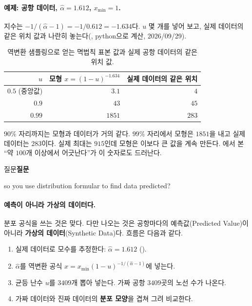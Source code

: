 \documentclass[11pt]{article}
\newenvironment{callout}[1][]
  {\par\medskip\noindent
   \begin{lrbox}{\calloutbox}\begin{minipage}{0.92\linewidth}
   \def\calloutttl{#1}\ifx\calloutttl\empty\else\textbf{#1}\par\smallskip\fi}
  {\end{minipage}\end{lrbox}%
   \fcolorbox{black!30}{black!3}{\usebox{\calloutbox}}\par\medskip}
\newcommand{\term}[1]{\textbf{#1}}
\begin{document}
\paragraph{예제: 공항 데이터, $\hat\alpha = 1.612$, $x_{\min} = 1$.}
지수는 $-1/(\hat\alpha - 1) = -1/0.612 = -1.634$다. $u$ 몇 개를 넣어 보고, 실제 데이터의
같은 위치 값과 나란히 놓는다(, python으로 계산, 2026/09/29).

\begin{table}[H]
  \centering
  \caption{역변환 샘플링으로 얻는 멱법칙 표본 값과 실제 공항 데이터의 같은 위치 값.}
  \label{tab:p1a-inverse}
  \begin{tabular}{rrr}
    \toprule
    $u$ & 모형 $x = (1-u)^{-1.634}$ & 실제 데이터의 같은 위치 \\
    \midrule
    $0.5$ (중앙값) & $3.1$ & $4$ \\
    \midrule
    $0.9$ & $43$ & $45$ \\
    \midrule
    $0.99$ & $1851$ & $283$ \\
    \bottomrule
  \end{tabular}
\end{table}

$90\%$ 자리까지는 모형과 데이터가 거의 같다. $99\%$ 자리에서 모형은 $1851$을 내고
실제 데이터는 $283$이다. 실제 최대는 $915$인데 모형은 이보다 큰 값을 계속 만든다.
에서 본 ``약 $100$개 이상에서 어긋난다''가 이 숫자로도 드러난다.

\begin{callout}[질문]
so you use distribution formular to find data predicted?
\end{callout}

\paragraph{예측이 아니라 가상의 데이터다.}
분포 공식을 쓰는 것은 맞다. 다만 나오는 것은 공항마다의 예측값(Predicted Value)이
아니라 \term{가상의 데이터}(Synthetic Data)다. 흐름은 다음과 같다.
\begin{enumerate}
  \item 실제 데이터로 모수를 추정한다: $\hat\alpha = 1.612$ ().
  \item $\hat\alpha$를 역변환 공식 $x = x_{\min}(1-u)^{-1/(\hat\alpha-1)}$에 넣는다.
  \item 균등 난수 $u$를 $3409$개 뽑아 넣는다. 가짜 공항 $3409$곳의 노선 수가 나온다.
  \item 가짜 데이터와 진짜 데이터의 \term{분포 모양}을 겹쳐 그려 비교한다.
\end{enumerate}
\end{document}
